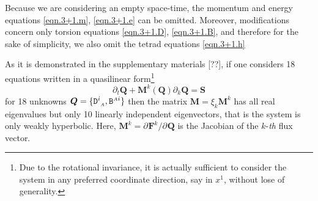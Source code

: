 \documentclass[
10pt, %
a4paper, %
oneside, %
headinclude,footinclude, %
BCOR5mm, %
]{scrartcl}
\newcommand{\sA}{\mathsmaller A}
\newcommand{\pd}[1]{\partial_{#1}}
\newcommand{\Dfin}[2]{\mathtt{D}_{\phantom{#2}#1}^{#2}}	%
\newcommand{\Bfin}[2]{\mathtt{B}^{#1#2}}	%
\begin{document}
Because we are considering an empty space-time, the momentum and energy equations \eqref{eqn.3+1.m}, 
\eqref{eqn.3+1.e} can be omitted. Moreover, modifications concern only torsion equations 
\eqref{eqn.3+1.D}, \eqref{eqn.3+1.B}, and 
therefore for the sake of simplicity, we also omit the tetrad equations \eqref{eqn.3+1.h}

As it is demonstrated in the supplementary materials [??], if one considers 18 equations written in a 
quasilinear form\footnote{Due to the rotational invariance, 
it is actually sufficient to consider the system in any preferred coordinate direction, say in $ x^1 
$, without lose of generality.}
\begin{equation}\label{eqn.quasi.lin}
	\pd{t} \bm{Q} + \bm{M}^k(\bm{Q})\pd{k} \bm{Q} = \bm{S}
\end{equation}
for 18 unknowns $ \bm{Q}=\{ \Dfin{\sA}{i}, \Bfin{\sA}{i} \} $ then the matrix $ \bm{M} = \xi_k 
\bm{M}^k $ has all real eigenvalues but only 10 linearly independent eigenvectors, that is the 
system is only 
weakly hyperbolic. Here, $ \bm{M}^k =
\pd{}\bm{F}^k/\pd{}\bm{Q} $ is the Jacobian of the $ k $-\textit{th} flux vector.
\end{document}
